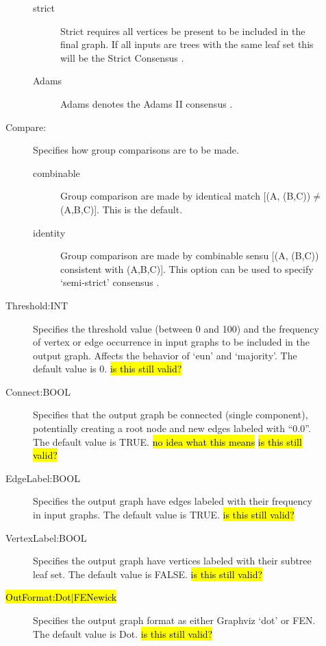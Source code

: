 \begin{description}
\begin{description}
\begin{description}
				\item[strict] Strict requires all vertices be present to be included in the final graph. 
				If all inputs are trees with the same leaf set this will be the Strict Consensus 
				\citep{Schuhandpolhemus1980}. 

				\item[Adams] Adams denotes the Adams II consensus \citep{Adams1972}.				
				\end{description}
			
			\item [Compare:] Specifies how group comparisons are to be made.
						
				\begin{description}
				\item[combinable] Group comparison are made by identical match 
				[(A, (B,C))$\neq$(A,B,C)]. This is the default.	
								
				\item[identity] Group comparison are made by combinable sensu \cite{Nelson1979}
				 [(A, (B,C)) consistent with (A,B,C)]. This option can be used to specify `semi-strict' 
				 consensus \citep{Bremer1990}.
				\end{description}
			
			\item [Threshold:INT] Specifies the threshold value (between 0 and 100) 
			and the frequency of vertex or edge occurrence in input graphs to be included 
			in the output graph. Affects the behavior of `eun' and `majority'. The default value
			is $0$. \hl{is this still valid?}
			
			\item [Connect:BOOL] Specifies that the output graph be connected 
			(single component), potentially creating a root node and new edges labeled 
			with ``0.0''. The default value is TRUE. \hl{no idea what this means} \hl{is this still valid?}
			
			\item [EdgeLabel:BOOL] Specifies the output graph have edges 
			labeled with their frequency in input graphs. The default value is TRUE. \hl{is this still valid?}
			
			\item [VertexLabel:BOOL] Specifies the output graph have vertices 
			labeled with their subtree leaf set. The default value is FALSE. \hl{is this still valid?}
	
			\item [\hl{OutFormat:Dot$\mid$FENewick}] Specifies the output graph format 
			as either Graphviz `dot' or FEN. The default value is Dot.  \hl{is this still valid?}
			\end{description}	
				

\end{description}
